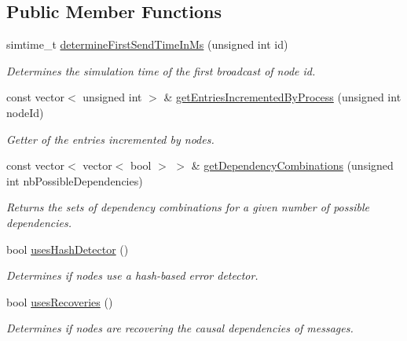 \subsection*{Public Member Functions}
\begin{DoxyCompactItemize}
\item 
simtime\+\_\+t \hyperlink{class_simulation_parameters_acf83b84e172a799e1db3bf9554c4787f}{determine\+First\+Send\+Time\+In\+Ms} (unsigned int id)
\begin{DoxyCompactList}\small\item\em Determines the simulation time of the first broadcast of node id. \end{DoxyCompactList}\item 
const vector$<$ unsigned int $>$ \& \hyperlink{class_simulation_parameters_aa8a52acbc3c5d374decafb59dcf0e971}{get\+Entries\+Incremented\+By\+Process} (unsigned int node\+Id)
\begin{DoxyCompactList}\small\item\em Getter of the entries incremented by nodes. \end{DoxyCompactList}\item 
const vector$<$ vector$<$ bool $>$ $>$ \& \hyperlink{class_simulation_parameters_a39008b8c9ed5c7c27dbfe7c5355d8062}{get\+Dependency\+Combinations} (unsigned int nb\+Possible\+Dependencies)
\begin{DoxyCompactList}\small\item\em Returns the sets of dependency combinations for a given number of possible dependencies. \end{DoxyCompactList}\item 
bool \hyperlink{class_simulation_parameters_a65939e54b0e75c32489b9d27fa84848d}{uses\+Hash\+Detector} ()
\begin{DoxyCompactList}\small\item\em Determines if nodes use a hash-\/based error detector. \end{DoxyCompactList}\item 
bool \hyperlink{class_simulation_parameters_ae5dc96e5e8aff8ee3961abeded5e3209}{uses\+Recoveries} ()
\begin{DoxyCompactList}\small\item\em Determines if nodes are recovering the causal dependencies of messages. \end{DoxyCompactList}\end{DoxyCompactItemize}
